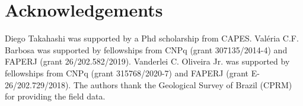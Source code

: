 \section{Acknowledgements}

Diego Takahashi was supported by a Phd scholarship from CAPES. 
Val{\'e}ria C.F. Barbosa was supported by fellowships from CNPq (grant 307135/2014-4) 
and FAPERJ (grant 26/202.582/2019). Vanderlei C. Oliveira Jr. was supported 
by fellowships from CNPq (grant 315768/2020-7) and FAPERJ (grant E-26/202.729/2018). 
The authors thank the Geological Survey of Brazil (CPRM) for providing the field data.